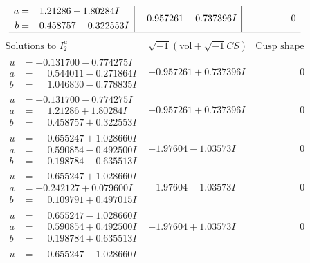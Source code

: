 \documentclass[1p]{elsarticle_modified}
\theoremstyle{definition}
\newcommand{\I}{\sqrt{-1}}
\begin{document}
$$\begin{array}{c|c|c}
\begin{aligned}
a &= \phantom{-}1.21286 - 1.80284 I \\
b &= \phantom{-}0.458757 - 0.322553 I\end{aligned}
 & -0.957261 - 0.737396 I & \phantom{-0.000000 } 0\\
 \hline 
 \end{array}$$\newpage$$\begin{array}{c|c|c}  
\text{Solutions to }I^u_{2}& \I (\text{vol} + \sqrt{-1}CS) & \text{Cusp shape}\\
 \hline 
\begin{aligned}
u &= -0.131700 - 0.774275 I \\
a &= \phantom{-}0.544011 - 0.271864 I \\
b &= \phantom{-}1.046830 - 0.778835 I\end{aligned}
 & -0.957261 + 0.737396 I & \phantom{-0.000000 } 0 \\ \hline\begin{aligned}
u &= -0.131700 - 0.774275 I \\
a &= \phantom{-}1.21286 + 1.80284 I \\
b &= \phantom{-}0.458757 + 0.322553 I\end{aligned}
 & -0.957261 + 0.737396 I & \phantom{-0.000000 } 0 \\ \hline\begin{aligned}
u &= \phantom{-}0.655247 + 1.028660 I \\
a &= \phantom{-}0.590854 - 0.492500 I \\
b &= \phantom{-}0.198784 - 0.635513 I\end{aligned}
 & -1.97604 - 1.03573 I & \phantom{-0.000000 } 0 \\ \hline\begin{aligned}
u &= \phantom{-}0.655247 + 1.028660 I \\
a &= -0.242127 + 0.079600 I \\
b &= \phantom{-}0.109791 + 0.497015 I\end{aligned}
 & -1.97604 - 1.03573 I & \phantom{-0.000000 } 0 \\ \hline\begin{aligned}
u &= \phantom{-}0.655247 - 1.028660 I \\
a &= \phantom{-}0.590854 + 0.492500 I \\
b &= \phantom{-}0.198784 + 0.635513 I\end{aligned}
 & -1.97604 + 1.03573 I & \phantom{-0.000000 } 0 \\ \hline\begin{aligned}
u &= \phantom{-}0.655247 - 1.028660 I \\

\end{aligned}
\end{array}$$
\end{document}
